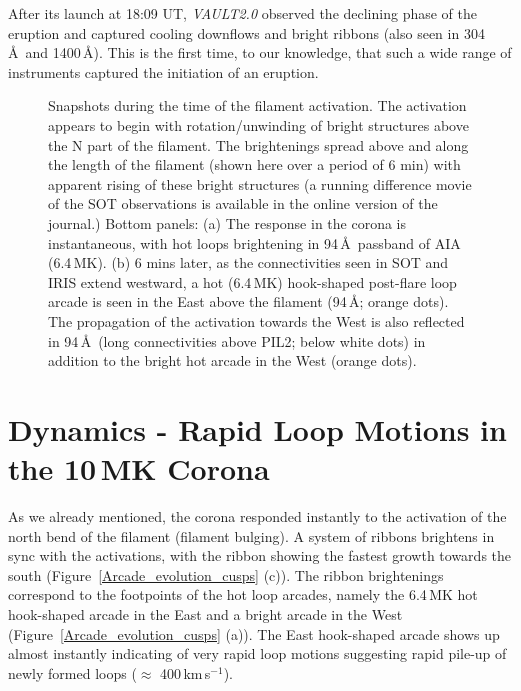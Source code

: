 \documentclass[preprint]{aastex}
\begin{document}
After its launch at 18:09 UT, \textit{VAULT2.0} observed the declining phase of the eruption and captured cooling downflows and bright ribbons (also seen in 304\,\AA\ and 1400\,\AA). This is the first time, to our knowledge, that such a wide range of instruments captured the initiation of an eruption.



\begin{figure*}
\caption{Snapshots during the time of the filament activation. The activation appears to begin with rotation/unwinding of bright structures above the N part of the filament. The brightenings spread above and along the length of the filament (shown here over a period of 6 min) with apparent rising of these bright structures (a running difference movie of the SOT observations is available in the online version of the journal.)  Bottom panels: (a) The response in the corona is instantaneous, with hot loops brightening in 94\,\AA\ passband of AIA (6.4\,MK). (b) 6 mins later, as the connectivities seen in SOT and IRIS extend westward, a hot (6.4\,MK) hook-shaped post-flare loop arcade is seen in the East above the filament (94\,\AA ; orange dots). The propagation of the activation towards the West is also reflected in 94\,\AA\ (long connectivities above PIL2; below white dots) in addition to the bright hot arcade in the West (orange dots).}
\label{IRIS_SOT_AIA_evolution}%
\end{figure*}

\section{Dynamics - Rapid Loop Motions in the 10\,MK Corona}
As we already mentioned, the corona responded instantly to the activation of the north bend of the filament (filament bulging). A system of ribbons brightens in sync with the activations, with the ribbon showing the fastest growth towards the south (Figure~\ref{Arcade_evolution_cusps} (c)). The ribbon brightenings correspond to the footpoints of the hot loop arcades, namely the 6.4\,MK hot hook-shaped arcade in the East and a bright arcade in the West (Figure~\ref{Arcade_evolution_cusps} (a)). The East hook-shaped arcade shows up almost instantly indicating of very rapid loop motions suggesting rapid pile-up of newly formed loops ($\approx$ 400\,km\,s$^{-1}$).
\end{document}
